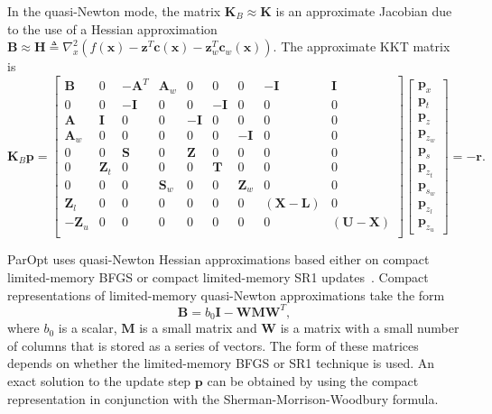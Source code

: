 \documentclass[12pt]{article}
\newcommand{\mb}{\mathbf}
\begin{document}
In the quasi-Newton mode, the matrix $\mb{K}_{B} \approx \mb{K}$ is an approximate Jacobian due to the use of a Hessian approximation $\mb{B} \approx \mb{H} \triangleq \nabla_{x}^{2} \left(f(\mb{x}) - \mb{z}^{T}\mb{c}(\mb{x}) - \mb{z}_{w}^{T}\mb{c}_{w}(\mb{x}) \right)$.
The approximate KKT matrix is
%
\begin{equation}
  \label{eqn:kkt-update}
  \mb{K}_{B}\mb{p} =
  \begin{bmatrix}
    \mb{B}    &      0 & -\mb{A}^{T} & \mb{A}_{w} &       0 &       0 &      0 & -\mb{I} & \mb{I} \\
    0 &              0 &     -\mb{I} &          0 &       0 & -\mb{I} &      0 &      0 &  0 \\
    \mb{A}    & \mb{I} &           0 &         0 & -\mb{I} &       0 &      0 &       0 & 0 \\
    \mb{A}_{w} &      0 &           0 &         0 &      0 &        0 & -\mb{I} &       0 & 0 \\
    0 &              0 &       \mb{S} &        0 & \mb{Z} &        0 &       0 &       0 & 0 \\
    0 &      \mb{Z}_{t} &           0 &        0 &       0 &   \mb{T} &       0 &       0 & 0 \\
    0 &              0 &                    0 & \mb{S}_{w} &      0 &       0 & \mb{Z}_{w} &  0 & 0 \\
    \mb{Z}_{l}  &     0 &           0 &          0 &      0 &       0 & 0 & (\mb{X} - \mb{L}) & 0 \\
    -\mb{Z}_{u} &     0 &          0 &          0 &      0 &       0 & 0 & 0 & (\mb{U} - \mb{X}) \\
  \end{bmatrix}
  \begin{bmatrix}
    \mb{p}_{x} \\
    \mb{p}_{t} \\
    \mb{p}_{z} \\
    \mb{p}_{z_{w}} \\
    \mb{p}_{s} \\
    \mb{p}_{z_{t}} \\
    \mb{p}_{s_{w}} \\
    \mb{p}_{z_{l}} \\
    \mb{p}_{z_{u}}
  \end{bmatrix} = -\mb{r}.
\end{equation}

ParOpt uses quasi-Newton Hessian approximations based either on compact limited-memory BFGS or compact limited-memory SR1 updates~\citep{Byrd:1994:quasi-Newton-LBFGS}. 
Compact representations of limited-memory quasi-Newton approximations take the form
%
\begin{equation*}
  \mb{B} = b_0\mb{I} - \mb{W}\mb{M}\mb{W}^{T},
\end{equation*}
where $b_0$ is a scalar, $\mb{M}$ is a small matrix and $\mb{W}$ is a matrix with a small number of columns that is stored as a series of vectors.
The form of these matrices depends on whether the limited-memory BFGS or SR1 technique is used. 
An exact solution to the update step $\mb{p}$ can be obtained by using the compact representation in conjunction with the Sherman-Morrison-Woodbury formula.
\end{document}
